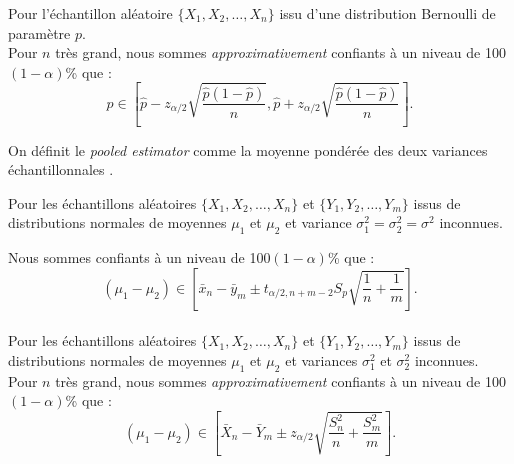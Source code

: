 \documentclass[10pt, french]{article}
\begin{document}
\begin{multicols*}{2}
\begin{definitionNOHFILLsub}
Pour l'échantillon aléatoire $\{X_{1}, X_{2}, \dots, X_{n}\}$ issu d'une distribution Bernoulli de paramètre $p$.\\

Pour $n$ très grand, nous sommes \textit{approximativement} confiants à un niveau de 100$(1 - \alpha)$\% que :
\begin{equation*}
	p \in \left[ \hat{p} - z_{\alpha/2} \sqrt{\frac{\hat{p}(1 - \hat{p})}{n}}, \hat{p} + z_{\alpha/2} \sqrt{\frac{\hat{p}(1 - \hat{p})}{n}}\right].
\end{equation*}
\end{definitionNOHFILLsub}

On définit le \og \textit{pooled estimator} \fg{} comme la moyenne pondérée des deux variances échantillonnales .\\


\begin{definitionNOHFILLsub}
Pour les échantillons aléatoires $\{X_{1}, X_{2}, \dots, X_{n}\}$ et $\{Y_{1}, Y_{2}, \dots, Y_{m}\}$ issus de distributions normales de moyennes $\mu_{1}$ et $\mu_{2}$ et variance $\sigma^{2}_{1} = \sigma^{2}_{2} = \sigma^{2}$ inconnues.

Nous sommes confiants à un niveau de 100$(1 - \alpha)$\% que :
\begin{equation*}
	(\mu_{1}	-	\mu_{2}) \in \left[ 
	\bar{x}_{n}	-	\bar{y}_{m}
	\pm	t_{\alpha/2, n + m - 2} S_{p}\sqrt{\frac{1}{n} + \frac{1}{m}} \right].
\end{equation*}
\begin{align*}
\end{align*}
\end{definitionNOHFILLsub}

\begin{definitionNOHFILLsub}
Pour les échantillons aléatoires $\{X_{1}, X_{2}, \dots, X_{n}\}$ et $\{Y_{1}, Y_{2}, \dots, Y_{m}\}$ issus de distributions normales de moyennes $\mu_{1}$ et $\mu_{2}$ et variances $\sigma^{2}_{1}$ et $\sigma^{2}_{2}$ inconnues.\\

Pour $n$ très grand, nous sommes \textit{approximativement} confiants à un niveau de 100$(1 - \alpha)$\% que :
\begin{equation*}
	(\mu_{1}	-	\mu_{2}) \in \left[ 
	\bar{X}_{n}	-	\bar{Y}_{m}
	\pm	z_{\alpha/2} \sqrt{\frac{S_{n}^{2}}{n} + \frac{S_{m}^{2}}{m}} \right].
\end{equation*}
\begin{align*}
\end{align*}
\end{definitionNOHFILLsub}


\end{multicols*}
\end{document}
